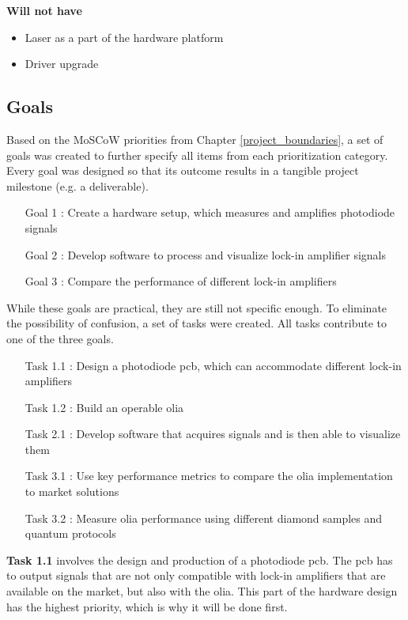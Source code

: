 \textbf{Will not have}
\begin{itemize}
	\item Laser as a part of the hardware platform
	\item Driver upgrade
\end{itemize}


\subsection{Goals} \label{chap:goals}
Based on the MoSCoW priorities from Chapter \ref{project_boundaries}, a set of goals was created to further specify all items from each prioritization category. Every goal was designed so that its outcome results in a tangible project milestone (e.g. a deliverable).

\begin{itemize}
	\item[Goal 1]: Create a hardware setup, which measures and amplifies photodiode signals
	\item[Goal 2]: Develop software to process and visualize lock-in amplifier signals
	\item[Goal 3]: Compare the performance of different lock-in amplifiers
\end{itemize}

While these goals are practical, they are still not specific enough. To eliminate the possibility of confusion, a set of tasks were created. All tasks contribute to one of the three goals.

\begin{itemize}
	\item[Task 1.1]: Design a photodiode \gls{pcb}, which can accommodate different lock-in amplifiers
	\item[Task 1.2]: Build an operable \gls{olia}
	\item[Task 2.1]: Develop software that acquires signals and is then able to visualize them
	\item[Task 3.1]: Use key performance metrics to compare the \gls{olia} implementation to market solutions
	\item[Task 3.2]: Measure \gls{olia} performance using different diamond samples and quantum protocols
\end{itemize}

\textbf{Task 1.1} involves the design and production of a photodiode \gls{pcb}. The \gls{pcb} has to output signals that are not only compatible with lock-in amplifiers that are available on the market, but also with the \gls{olia}. This part of the hardware design has the highest priority, which is why it will be done first. 

